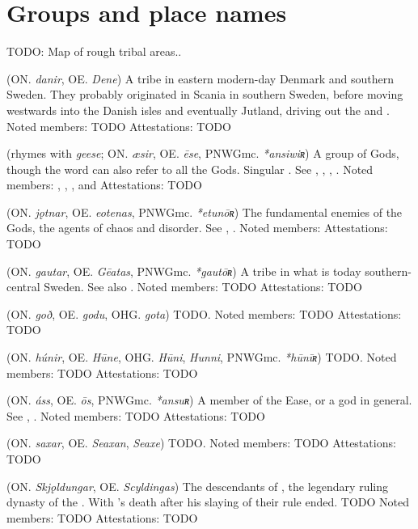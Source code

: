 \section{Groups and place names}
\begin{itemize}

TODO: Map of rough tribal areas..

 (ON. \emph{danir}, OE. \emph{Dene})
  A tribe in eastern modern-day Denmark and southern Sweden. They probably originated in Scania in southern Sweden, before moving westwards into the Danish isles and eventually Jutland, driving out the  and .
  Noted members: TODO
  Attestations: TODO

 (rhymes with \emph{geese}; ON. \emph{æsir}, OE. \emph{ēse}, PNWGmc. \emph{*ansiwiʀ})
  A group of Gods, though the word can also refer to all the Gods. Singular . See , , , .
  Noted members: , , ,  and 
  Attestations: TODO

 (ON. \emph{jǫtnar}, OE. \emph{eotenas}, PNWGmc. \emph{*etunōʀ})
  The fundamental enemies of the Gods, the agents of chaos and disorder. See , .
  Noted members: 
  Attestations: TODO

 (ON. \emph{gautar}, OE. \emph{Gēatas}, PNWGmc. \emph{*gautōʀ})
  A tribe in what is today southern-central Sweden. See also .
  Noted members: TODO
  Attestations: TODO

 (ON. \emph{goð}, OE. \emph{godu}, OHG. \emph{gota})
  TODO.
  Noted members: TODO
  Attestations: TODO

 (ON. \emph{húnir}, OE. \emph{Hūne}, OHG. \emph{Hūni}, \emph{Hunni}, PNWGmc. \emph{*hūnīʀ})
  TODO.
  Noted members: TODO
  Attestations: TODO

 (ON. \emph{áss}, OE. \emph{ōs}, PNWGmc. \emph{*ansuʀ})
  A member of the Ease, or a god in general. See , .
  Noted members: TODO
  Attestations: TODO

 (ON. \emph{saxar}, OE. \emph{Seaxan}, \emph{Seaxe})
  TODO.
  Noted members: TODO
  Attestations: TODO

 (ON. \emph{Skjǫldungar}, OE. \emph{Scyldingas})
  The descendants of , the legendary ruling dynasty of the . With 's death after his slaying of  their rule ended. TODO
  Noted members: TODO
  Attestations: TODO


\end{itemize}
